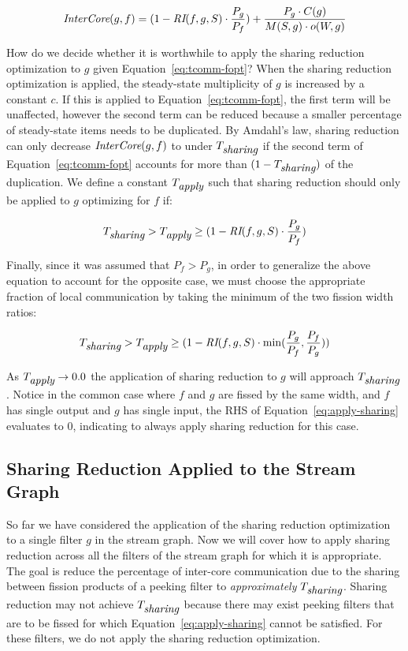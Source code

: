 \begin{equation}
\label{eq:tcomm-fopt}
 \mbox{\it InterCore}(g, f)   =  (1 -\mbox{\it RI}(f,g, S) \cdot \frac{P_g}{P_f})
 + \frac{P_g \cdot C(g)}{M(S, g) \cdot o(W, g)}
\end{equation}

How do we decide whether it is worthwhile to apply the sharing
reduction optimization to $g$ given Equation~\ref{eq:tcomm-fopt}? When
the sharing reduction optimization is applied, the steady-state
multiplicity of $g$ is increased by a constant $c$.  If this is
applied to Equation~\ref{eq:tcomm-fopt}, the first term will be
unaffected, however the second term can be reduced because a smaller
percentage of steady-state items needs to be duplicated.  By Amdahl's
law, sharing reduction can only decrease $\mbox{\it InterCore}(g,
f)$ to under $T_{\mbox{\it sharing}}$ if the second term of Equation~\ref{eq:tcomm-fopt}
accounts for more than $(1-T_{\mbox{\it sharing}} )$ of the duplication.  We
define a constant $T_{\mbox{\it apply}}$ such that sharing
reduction should only be applied to $g$ optimizing for $f$ if:

\begin{equation}
T_{\mbox{\it sharing}}  >  T_{\mbox{\it apply}} \ge (1 -\mbox{\it RI}(f,g, S) \cdot
\frac{P_g}{P_f})
\end{equation}

Finally, since it was assumed that $P_f > P_g$, in order to generalize
the above equation to account for the opposite case, we must choose
the appropriate fraction of local communication by taking the minimum
of the two fission width ratios:

\begin{equation}
\label{eq:apply-sharing}
T_{\mbox{\it sharing}}  >  T_{\mbox{\it apply}} \ge (1 -\mbox{\it RI}(f,g, S) \cdot
\min(\frac{P_g}{P_f}, \frac{P_f}{P_g}))
\end{equation}

\noindent As $T_{\mbox{\it apply}} \rightarrow 0.0$ the application of
sharing reduction to $g$ will approach $T_{\mbox{\it sharing}}$. Notice in
the common case where $f$ and $g$ are fissed by the same width, and
$f$ has single output and $g$ has single input, the RHS of
Equation~\ref{eq:apply-sharing} evaluates to 0, indicating to always
apply sharing reduction for this case.

\subsection{Sharing Reduction Applied to the Stream Graph}
So far we have considered the application of the sharing reduction
optimization to a single filter $g$ in the stream graph.  Now we will
cover how to apply sharing reduction across all the filters of the
stream graph for which it is appropriate.  The goal is reduce the
percentage of inter-core communication due to the sharing between
fission products of a peeking filter to {\it approximately}
$T_{\mbox{\it sharing}}$.  Sharing reduction may not achieve
$T_{\mbox{\it sharing}}$ because there may exist peeking filters that are to
be fissed for which Equation~\ref{eq:apply-sharing} cannot be
satisfied.  For these filters, we do not apply the sharing reduction
optimization.

